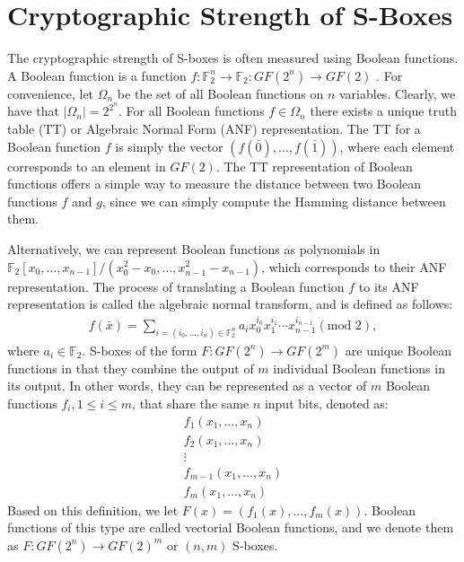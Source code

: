\section{Cryptographic Strength of S-Boxes}
The cryptographic strength of S-boxes is often measured using Boolean functions. 
A Boolean function is a function $f : \mathbb{F}_2^n \to \mathbb{F}_2 : GF(2^n) \to GF(2)$ \cite{Cusik09-1}.
For convenience, let $\Omega_n$ be the set of all Boolean functions on $n$ variables. Clearly,
we have that $|\Omega_n| = 2^{2^{n}}$. For all Boolean functions $f \in \Omega_n$ there exists a
unique truth table (TT) or Algebraic Normal Form (ANF) representation. The TT for a Boolean function
$f$ is simply the vector $(f(\bar{0}), \dots, f(\bar{1}))$, where each element corresponds to an element in $GF(2)$. 
The TT representation of Boolean functions offers a simple way to measure the distance between two
Boolean functions $f$ and $g$, since we can simply compute the Hamming distance between them.

Alternatively, we can represent Boolean functions as polynomials in $\mathbb{F}_2[x_0,\dots,x_{n-1}]/(x_0^2 - x_0,\dots,x_{n-1}^2 - x_{n-1})$,
which corresponds to their ANF representation. The process of translating a Boolean function $f$ to its ANF representation
is called the algebraic normal transform, and is defined as follows:
\begin{align*}
f(\bar{x}) = \sum_{i = (i_0,\dots,i_n) \in \mathbb{F}_2^n}a_ix_0^{i_0}x_1^{i_1}\dotsb x_{n-1}^{i_{n-1}} (\text{mod 2}),
\end{align*}
where $a_i \in \mathbb{F}_2$. S-boxes of the form $F : GF(2^n) \to GF(2^m)$ are unique Boolean functions in that they combine 
the output of $m$ individual Boolean functions in its output. In other words, they 
can be represented as a vector of $m$ Boolean functions $f_i, 1 \leq i \leq m$, that share the same
$n$ input bits, denoted as:
\begin{align*}
f_1(x_1,\dots,x_n) \\
f_2(x_1,\dots,x_n) \\
\vdots \\
f_{m-1}(x_1,\dots,x_n) \\
f_m(x_1,\dots,x_n)
\end{align*}
Based on this definition, we let $F(x) = (f_1(x),\dots,f_m(x))$. Boolean functions of this
type are called vectorial Boolean functions, and we denote them as $F : GF(2^n) \to GF(2)^m$
or $(n,m)$ S-boxes.

